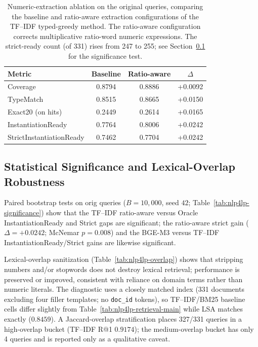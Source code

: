 \documentclass[pdflatex,sn-basic,Numbered]{sn-jnl}
\begin{document}
\begin{table}[t]
  \centering
  \caption{Numeric-extraction ablation on the original queries, comparing the baseline and ratio-aware extraction configurations of the TF--IDF typed-greedy method. The ratio-aware configuration corrects multiplicative ratio-word numeric expressions. The strict-ready count (of 331) rises from 247 to 255; see Section~\ref{subsec:exp_significance} for the significance test.}
  \label{tab:nlp4lp-prefix-postfix}
  \small
  \setlength{\tabcolsep}{4pt}
  \begin{tabular}{lccc}
    \toprule
    Metric & Baseline & Ratio-aware & $\Delta$ \\
    \midrule
    Coverage & 0.8794 & 0.8886 & +0.0092 \\
    TypeMatch & 0.8515 & 0.8665 & +0.0150 \\
    Exact20 (on hits) & 0.2449 & 0.2614 & +0.0165 \\
    InstantiationReady & 0.7764 & 0.8006 & +0.0242 \\
    StrictInstantiationReady & 0.7462 & 0.7704 & +0.0242 \\
    \bottomrule
  \end{tabular}
\end{table}

\subsection{Statistical Significance and Lexical-Overlap Robustness}
\label{subsec:exp_significance}

Paired bootstrap tests on orig queries ($B=10{,}000$, seed $42$; Table~\ref{tab:nlp4lp-significance}) show that the TF--IDF ratio-aware versus Oracle InstantiationReady and Strict gaps are significant; the ratio-aware strict gain ($\Delta=+0.0242$; McNemar $p=0.008$) and the BGE-M3 versus TF--IDF InstantiationReady/Strict gains are likewise significant.

Lexical-overlap sanitization (Table~\ref{tab:nlp4lp-overlap}) shows that stripping numbers and/or stopwords does not destroy lexical retrieval; performance is preserved or improved, consistent with reliance on domain terms rather than numeric literals. The diagnostic uses a closely matched index (331 documents excluding four filler templates; no \texttt{doc\_id} tokens), so TF--IDF/BM25 baseline cells differ slightly from Table~\ref{tab:nlp4lp-retrieval-main} while LSA matches exactly ($0.8459$). A Jaccard-overlap stratification places 327/331 queries in a high-overlap bucket (TF--IDF R@1 $0.9174$); the medium-overlap bucket has only 4 queries and is reported only as a qualitative caveat.
\end{document}
